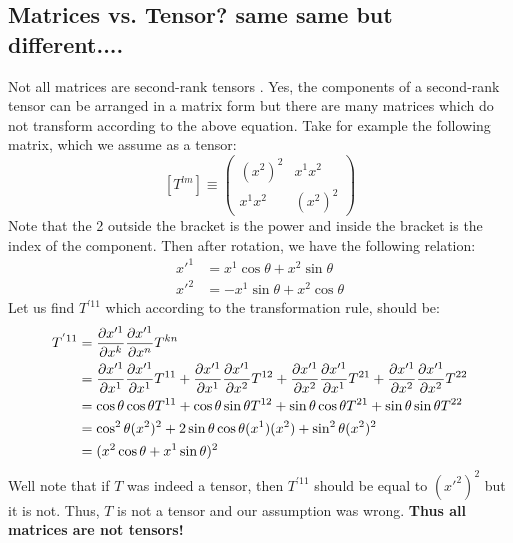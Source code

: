 \subsection{Matrices vs. Tensor? same same but different....}
Not all matrices are second-rank tensors . Yes, the components of a second-rank tensor can be arranged in a matrix form but there are many matrices which do not transform according to the above equation. Take for example the following matrix, which we assume as a tensor:
$$[T^{lm}] \equiv \begin{pmatrix}
    (x^2)^2 & x^1x^2\\
    x^1x^2 & (x^2)^2
\end{pmatrix}$$
Note that the 2 outside the bracket is the power and inside the bracket is the index of the component. Then after rotation, we have the following relation:
\begin{align*}
    x'^1 &= x^1\cos\theta + x^2\sin\theta \\
    x'^2 &= -x^1\sin\theta + x^2\cos\theta
\end{align*}
Let us find $T^{'11}$ which according to the transformation rule, should be:
\begin{align*}
    T^{'11} &= \pdv{x'^1}{x^k} \pdv{x'^1}{x^n} T^{kn} \\
    &=\pdv{x'^1}{x^1} \pdv{x'^1}{x^1} T^{11} + \pdv{x'^1}{x^1} \pdv{x'^1}{x^2} T^{12}+\pdv{x'^1}{x^2} \pdv{x'^1}{x^1} T^{21} +\pdv{x'^1}{x^2} \pdv{x'^1}{x^2}T^{22}\\
    &= \cos\theta\cos\theta T^{11} + \cos\theta \sin\theta T^{12} + \sin\theta\cos\theta T^{21} + \sin\theta\sin\theta T^{22} \\
    &= \cos^2\theta (x^2)^2 + 2\sin\theta\cos\theta (x^1)(x^2) + \sin^2\theta (x^2)^2\\
    &=(x^2\cos\theta + x^1\sin\theta)^2
\end{align*}
Well note that if $T$ was indeed a tensor, then $T^{'11}$ should be equal to $(x'^2)^2$ but it is not. Thus, $T$ is not a tensor and our assumption was wrong.  \textbf{Thus all matrices are not tensors!}